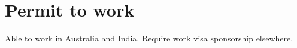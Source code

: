 \section*{Permit to work} %
\label{sec:ptw}

Able to work in Australia and India. Require work visa sponsorship elsewhere.
